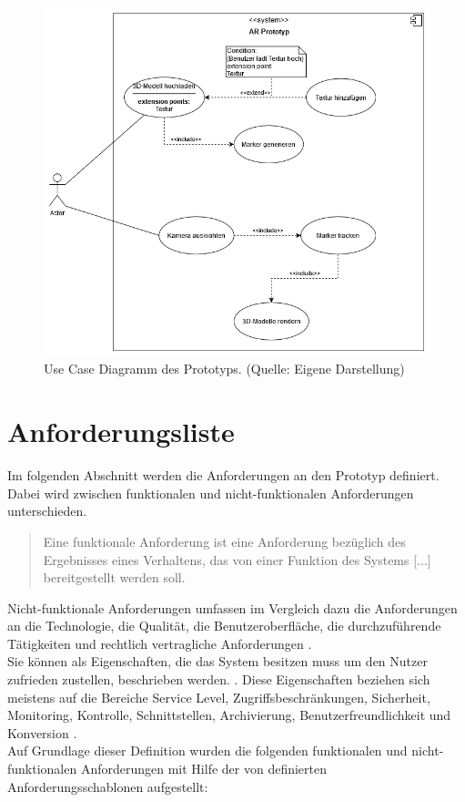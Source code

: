 \begin{figure}[h!]
\centering
\includegraphics[width=1.0\textwidth]{Abbildungen/use-case-diagram.png}
\caption[Use Cases des Prototyps]{Use Case Diagramm des Prototyps. (Quelle: Eigene Darstellung)}
\label{fig:Use-Cases}
\end{figure}


\section{Anforderungsliste}
Im folgenden Abschnitt werden die Anforderungen an den Prototyp definiert. Dabei wird zwischen funktionalen und nicht-funktionalen Anforderungen unterschieden. 
\begin{quote}
\glqq Eine funktionale Anforderung ist eine Anforderung bezüglich des Ergebnisses eines Verhaltens, das von einer Funktion des Systems [...] bereitgestellt werden soll.\grqq \citep[S. 17]{rupp:requirements}
\end{quote}
Nicht-funktionale Anforderungen umfassen im Vergleich dazu die Anforderungen an die Technologie, die Qualität, die Benutzeroberfläche, die durchzuführende Tätigkeiten und rechtlich vertragliche Anforderungen \citep[S. 17]{rupp:requirements}.\\
Sie können als Eigenschaften, die das System besitzen muss um den Nutzer zufrieden zustellen, beschrieben werden. \citep[S. 10]{robertson:requirements-process}. Diese Eigenschaften beziehen sich meistens auf die Bereiche Service Level, Zugriffsbeschränkungen, Sicherheit, Monitoring, Kontrolle, Schnittstellen, Archivierung, Benutzerfreundlichkeit und Konversion \citep[S. 139]{boehm:systementwicklung}. \\
Auf Grundlage dieser Definition wurden die folgenden funktionalen und nicht-funktionalen Anforderungen mit Hilfe der von \citeauthor[S. 219]{rupp:requirements} definierten Anforderungsschablonen aufgestellt:

